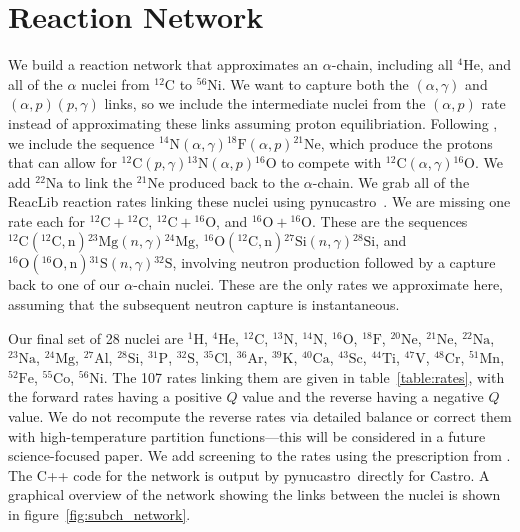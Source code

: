 \documentclass[linenumbers,trackchanges]{aastex631}
\newcommand{\castro}{{\sf Castro}}
\newcommand{\pynucastro}{{\sf pynucastro}}
\newcommand{\isotm}[2]{{}^{#2}\mathrm{#1}}
\begin{document}
\section{Reaction Network}
\label{sec:app:reactionnet}
We build a reaction network that approximates an $\alpha$-chain,
including all $\isotm{He}{4}$, and all of the $\alpha$ nuclei from
$\isotm{C}{12}$ to $\isotm{Ni}{56}$.  We want to capture both the
$(\alpha,\gamma)$ and $(\alpha,p)(p,\gamma)$ links, so we include the
intermediate nuclei from the $(\alpha,p)$ rate instead of
approximating these links assuming proton equilibriation.  Following
\citet{shenbildsten}, we include the sequence
$\isotm{N}{14}(\alpha,\gamma)\isotm{F}{18}(\alpha, p)\isotm{Ne}{21}$,
which produce the protons that can allow for $\isotm{C}{12}(p,
\gamma)\isotm{N}{13}(\alpha, p)\isotm{O}{16}$ to compete with
$\isotm{C}{12}(\alpha,\gamma)\isotm{O}{16}$.  We add $\isotm{Na}{22}$
to link the $\isotm{Ne}{21}$ produced back to the $\alpha$-chain.  We
grab all of the ReacLib \citep{reaclib} reaction rates linking these
nuclei using \pynucastro~\citep{pynucastro}.  We are missing one rate
each for $\isotm{C}{12} + \isotm{C}{12}$, $\isotm{C}{12} +
\isotm{O}{16}$, and $\isotm{O}{16} + \isotm{O}{16}$.  These are
the sequences $\isotm{C}{12}(\isotm{C}{12}, \mathrm{n})\isotm{Mg}{23}(n, \gamma)\isotm{Mg}{24}$,
$\isotm{O}{16}(\isotm{C}{12}, \mathrm{n})\isotm{Si}{27}(n, \gamma)\isotm{Si}{28}$, and
$\isotm{O}{16}(\isotm{O}{16}, \mathrm{n})\isotm{S}{31}(n, \gamma)\isotm{S}{32}$, involving neutron
production followed by a capture back to one of our $\alpha$-chain
nuclei.  These are the only rates we approximate here, assuming
that the subsequent neutron capture is instantaneous.

Our final set of 28 nuclei are ${}^{1}\mathrm{H}$, ${}^{4}\mathrm{He}$,
${}^{12}\mathrm{C}$, ${}^{13}\mathrm{N}$, ${}^{14}\mathrm{N}$,
${}^{16}\mathrm{O}$, ${}^{18}\mathrm{F}$, ${}^{20}\mathrm{Ne}$,
${}^{21}\mathrm{Ne}$, ${}^{22}\mathrm{Na}$, ${}^{23}\mathrm{Na}$,
${}^{24}\mathrm{Mg}$, ${}^{27}\mathrm{Al}$, ${}^{28}\mathrm{Si}$,
${}^{31}\mathrm{P}$, ${}^{32}\mathrm{S}$, ${}^{35}\mathrm{Cl}$,
${}^{36}\mathrm{Ar}$, ${}^{39}\mathrm{K}$, ${}^{40}\mathrm{Ca}$,
${}^{43}\mathrm{Sc}$, ${}^{44}\mathrm{Ti}$, ${}^{47}\mathrm{V}$,
${}^{48}\mathrm{Cr}$, ${}^{51}\mathrm{Mn}$, ${}^{52}\mathrm{Fe}$,
${}^{55}\mathrm{Co}$, ${}^{56}\mathrm{Ni}$.  The 107 rates linking them are
given in table~\ref{table:rates}, with the forward rates having a positive $Q$
value and the reverse having a negative $Q$ value.  We do not recompute the reverse
rates via detailed balance or correct them with high-temperature partition functions---this will be considered in a future science-focused paper.  We add screening to the
rates using the prescription from \citet{graboske:1973,alastuey:1978,itoh:1979}.
The C++ code for the network is output by \pynucastro\ directly for \castro.  A
graphical overview of the network showing the links between the nuclei is shown
in figure~\ref{fig:subch_network}.
\end{document}
